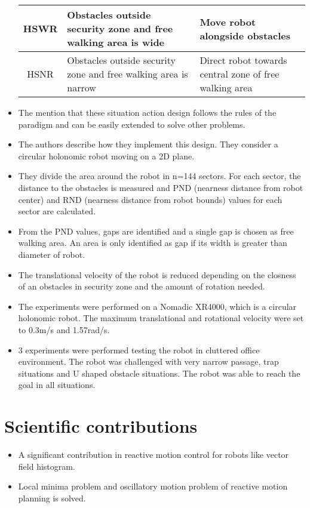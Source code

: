 \documentclass[12pt]{article}
\begin{document}
\begin{itemize}
\begin{tabular}{|c|p{6cm}|p{6cm}|}
            HSWR & Obstacles outside security zone and free walking area is wide & Move robot alongside obstacles \\\hline
            HSNR & Obstacles outside security zone and free walking area is narrow & Direct robot towards central zone of free walking area \\\hline
        \end{tabular}
    \item The mention that these situation action design follows the rules of the paradigm and can be easily extended to solve other problems.
    \item The authors describe how they implement this design. They consider a circular holonomic robot moving on a 2D plane. 
    \item They divide the area around the robot in n=144 sectors. For each sector, the distance to the obstacles is measured and PND (nearness distance from robot center) and RND (nearness distance from robot bounds) values for each sector are calculated.
    \item From the PND values, gaps are identified and a single gap is chosen as free walking area. An area is only identified as gap if its width is greater than diameter of robot.
    \item The translational velocity of the robot is reduced depending on the closness of an obstacles in security zone and the amount of rotation needed.
    \item The experiments were performed on a Nomadic XR4000, which is a circular holonomic robot. The maximum translational and rotational velocity were set to 0.3m/s and 1.57rad/s.
    \item 3 experiments were performed testing the robot in cluttered office environment. The robot was challenged with very narrow passage, trap situations and U shaped obstacle situations. The robot was able to reach the goal in all situations.
\end{itemize}

\section{Scientific contributions}
\begin{itemize}
    \item A significant contribution in reactive motion control for robots like vector field histogram\cite{borenstein1991the}.
    \item Local minima problem and oscillatory motion problem of reactive motion planning is solved.
\end{itemize}
\end{document}
